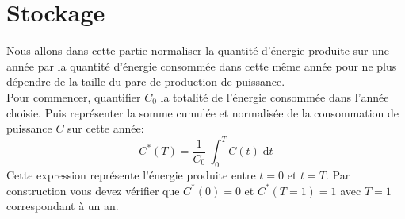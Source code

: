 \documentclass[12pt,a4,french]{article}
\begin{document}
%	
%	
%	
%	
%	

\section{Stockage}
Nous allons dans cette partie normaliser la quantité d'énergie produite sur une année par la quantité d'énergie consommée dans cette même année pour ne plus dépendre de la taille du parc de production de puissance. \\
Pour commencer, quantifier $C_0$ la totalité de l'énergie consommée dans l'année choisie. Puis  représenter la somme cumulée et normalisée de la consommation de puissance $C$ sur cette année:
\begin{equation}
	C^*(T)  = \frac{1}{C_0} ~ \int_{0}^{T}C(t) \; \text{d} t	
\end{equation}
Cette expression représente l'énergie produite entre $t=0$ et $t=T$. Par construction vous devez vérifier que $C^*(0)=0$ et $C^*(T=1)=1$ avec $T=1$ correspondant à un an. 
\end{document}

